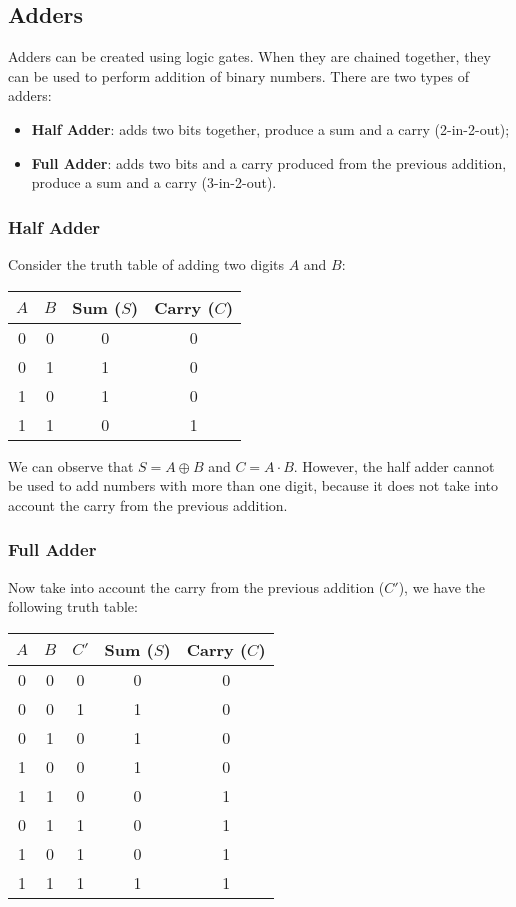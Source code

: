 \subsection{Adders}

Adders can be created using logic gates. When they are chained together, they can be used
to perform addition of binary numbers. There are two types of adders:
\begin{itemize}
    \item \textbf{Half Adder}: adds two bits together, produce a sum and a carry (2-in-2-out);
    \item \textbf{Full Adder}: adds two bits and a carry produced from the previous addition,
                                produce a sum and a carry (3-in-2-out).
\end{itemize}

\subsubsection{Half Adder}

Consider the truth table of adding two digits $A$ and $B$:
\begin{table}[H]
\centering
\begin{tabular}{|c|c||c|c|}
    \hline
    $A$ & $B$ & Sum ($S$) & Carry ($C$) \\
    \hline
    0 & 0 & 0 & 0 \\
    0 & 1 & 1 & 0 \\
    1 & 0 & 1 & 0 \\
    1 & 1 & 0 & 1 \\
    \hline
\end{tabular}
\end{table}

We can observe that $S=A\oplus B$ and $C=A\cdot B$. However, the half adder cannot be used
to add numbers with more than one digit, because it does not take into account the carry
from the previous addition.

\subsubsection{Full Adder}

Now take into account the carry from the previous addition ($C'$), we have the following truth table:
\begin{table}[H]
\centering
\begin{tabular}{|c|c|c||c|c|}
    \hline
    $A$ & $B$ & $C'$ & Sum ($S$) & Carry ($C$) \\
    \hline
    0 & 0 & 0 & 0 & 0 \\
    0 & 0 & 1 & 1 & 0 \\
    0 & 1 & 0 & 1 & 0 \\
    1 & 0 & 0 & 1 & 0 \\
    1 & 1 & 0 & 0 & 1 \\
    0 & 1 & 1 & 0 & 1 \\
    1 & 0 & 1 & 0 & 1 \\
    1 & 1 & 1 & 1 & 1 \\
    \hline
\end{tabular}
\end{table}

